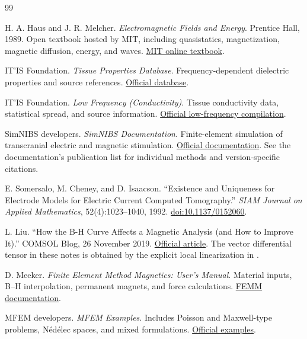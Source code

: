 \begin{thebibliography}{99}
\small\raggedright\setlength{\itemsep}{5pt}\setlength{\parskip}{0pt}
 H. A. Haus and J. R. Melcher. \emph{Electromagnetic Fields and Energy}. Prentice Hall, 1989. Open textbook hosted by MIT, including quasistatics, magnetization, magnetic diffusion, energy, and waves. \href{https://web.mit.edu/6.013_book/www/book.html}{MIT online textbook}.

 IT'IS Foundation. \emph{Tissue Properties Database}. Frequency-dependent dielectric properties and source references. \href{https://itis.swiss/virtual-population/tissue-properties/database}{Official database}.

 IT'IS Foundation. \emph{Low Frequency (Conductivity)}. Tissue conductivity data, statistical spread, and source information. \href{https://itis.swiss/virtual-population/tissue-properties/database/low-frequency-conductivity}{Official low-frequency compilation}.

 SimNIBS developers. \emph{SimNIBS Documentation}. Finite-element simulation of transcranial electric and magnetic stimulation. \href{https://simnibs.github.io/simnibs/}{Official documentation}. See the documentation's publication list for individual methods and version-specific citations.

 E. Somersalo, M. Cheney, and D. Isaacson. ``Existence and Uniqueness for Electrode Models for Electric Current Computed Tomography.'' \emph{SIAM Journal on Applied Mathematics}, 52(4):1023--1040, 1992. \href{https://doi.org/10.1137/0152060}{doi:10.1137/0152060}.

 L. Liu. ``How the B-H Curve Affects a Magnetic Analysis (and How to Improve It).'' COMSOL Blog, 26 November 2019. \href{https://www.comsol.com/blogs/how-the-b-h-curve-affects-a-magnetic-analysis-and-how-to-improve-it}{Official article}. The vector differential tensor in these notes is obtained by the explicit local linearization in .

 D. Meeker. \emph{Finite Element Method Magnetics: User's Manual}. Material inputs, B--H interpolation, permanent magnets, and force calculations. \href{https://www.femm.info/wiki/Documentation/}{FEMM documentation}.

 MFEM developers. \emph{MFEM Examples}. Includes Poisson and Maxwell-type problems, N\'ed\'elec spaces, and mixed formulations. \href{https://mfem.org/examples/}{Official examples}.


\end{thebibliography}
